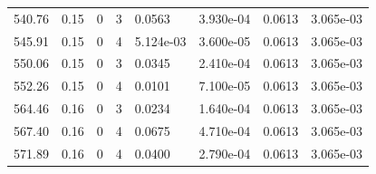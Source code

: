 \documentclass[preview]{standalone}
\begin{document}
{{{{\begin{tabular}{L{1.2cm}C{1.2cm} C{0.3cm}C{0.5cm} C{1.4cm}C{1.4cm} C{1.4cm}C{1.4cm}}
  540.76  &  0.15  & 0     &  3 &  0.0563  & 3.930e-04  & 0.0613 &  3.065e-03   \\ 
  545.91  &  0.15  & 0     &  4 &  5.124e-03  & 3.600e-05  & 0.0613 &  3.065e-03   \\ 
  550.06  &  0.15  & 0     &  3 &  0.0345  & 2.410e-04  & 0.0613 &  3.065e-03   \\ 
  552.26  &  0.15  & 0     &  4 &  0.0101  & 7.100e-05  & 0.0613 &  3.065e-03   \\ 
  564.46  &  0.16  & 0     &  3 &  0.0234  & 1.640e-04  & 0.0613 &  3.065e-03   \\ 
  567.40  &  0.16  & 0     &  4 &  0.0675  & 4.710e-04  & 0.0613 &  3.065e-03   \\ 
  571.89  &  0.16  & 0     &  4 &  0.0400  & 2.790e-04  & 0.0613 &  3.065e-03   \\ 
\hline 
\end{tabular} 

}}}}
\end{document}
